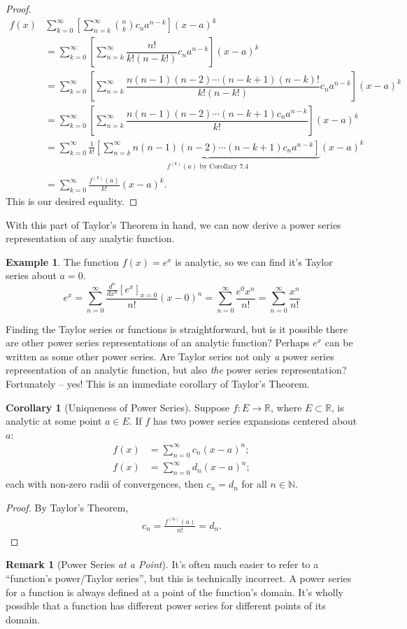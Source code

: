 \documentclass{article}
\newcommand{\N}{\mathbb{N}}
\newcommand{\R}{\mathbb{R}}
\theoremstyle{definition}
\newtheorem{corollary}{Corollary}[section]
\newtheorem{example}{Example}[section]
\newtheorem{remark}{Remark}[section]
\begin{document}
\begin{proof}
\begin{align*}
			f(x) & \sum_{k=0}^{\infty}\left[\sum_{n=k}^{\infty}\binom{n}{k}c_na^{n-k}\right](x-a)^k\\
			& = \sum_{k=0}^{\infty}\left[\sum_{n=k}^{\infty}\dfrac{n!}{k!(n-k!)}c_na^{n-k}\right](x-a)^k\\
			& = \sum_{k=0}^{\infty}\left[\sum_{n=k}^{\infty}\dfrac{n(n-1)(n-2)\cdots(n-k+1)(n-k)!}{k!(n-k!)}c_na^{n-k}\right](x-a)^k\\
			& = \sum_{k=0}^{\infty}\left[\sum_{n=k}^{\infty}\dfrac{n(n-1)(n-2)\cdots(n-k+1)c_na^{n-k}}{k!}\right](x-a)^k\\
			& = \sum_{k=0}^{\infty}\frac{1}{k!}\underbrace{\left[\sum_{n=k}^{\infty}n(n-1)(n-2)\cdots (n-k+1)c_na^{n-k}\right]}_{f^{(k)}(a) \text{ by Corollary 7.4}}(x-a)^k\\
			& = \sum_{k=0}^{\infty}\frac{f^{(k)}(a) }{k!}(x-a)^k.
		\end{align*}
		This is our desired equality. 
	\end{proof}
	
	With this part of Taylor's Theorem in hand, we can now derive a power series representation of any analytic function.
	\begin{example}
		The function $ f(x)=e^x $ is analytic, so we can find it's Taylor series about $ a = 0 $. 
		$$ e^x=\sum_{n=0}^{\infty}\frac{\frac{d^n}{dx^n}\left[e^x\right]_{x=0} }{n!}(x-0)^n = \sum_{n=0}^{\infty}\frac{e^0x^n}{n!} = \sum_{n=0}^{\infty}\frac{x^n}{n!} $$
	\end{example}
	Finding the Taylor series or functions is straightforward, but is it possible there are other power series representations of an analytic function? Perhaps $ e^x $ can be written as some other power series. Are Taylor series not only \textit{a} power series representation of an analytic function, but also \textit{the} power series representation? Fortunately -- yes! This is an immediate corollary of Taylor's Theorem. 
	
	\begin{corollary}[Uniqueness of Power Series]
		Suppose $ f:E\to\R $, where $ E\subset\R $, is analytic at some point $ a\in E $. If $ f $ has two power series expansions centered about $ a $:
		\begin{align*}
			f(x)&=\sum_{n=0}^{\infty}c_n(x-a)^n;\\
			f(x)&=\sum_{n=0}^{\infty}d_n(x-a)^n;
		\end{align*}
		each with non-zero radii of convergences, then $ c_n = d_n $ for all $ n\in\N $. 
	\end{corollary} 
	\begin{proof}
		By Taylor's Theorem,
		\begin{align*}
			c_n=\frac{f^{(n)}(a) }{n!}=d_n.
		\end{align*}
	\end{proof}
	\begin{remark}[Power Series \textit{at a Point}]
		It's often much easier to refer to a ``function's power/Taylor series'', but this is technically incorrect. A power series for a function is always defined at a point of the function's domain. It's wholly possible that a function has different power series for different points of its domain.
	\end{remark}
	
\end{document}
